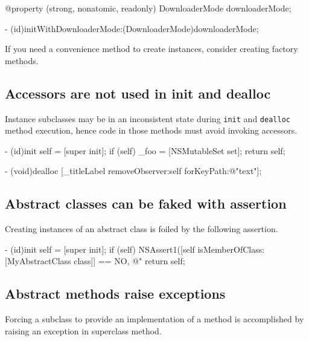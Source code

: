 \documentclass[10pt]{extarticle}
\newenvironment{codelisting}
{\footnotesize\mdframed[middlelinewidth=0.5pt, middlelinecolor=BaliHaiColor, skipabove=15pt]\verbatim}
{\endverbatim\endmdframed\vspace{12pt}\normalsize}
\newenvironment{tiplisting}
{\small\mdframed[middlelinewidth=0.5pt, middlelinecolor=GoldenDreamColor, skipabove=15pt]{\textbf{Tip:}}}
{\endmdframed\vspace{12pt}\normalsize}
\newcommand{\inlinecode}[1]{{\textcolor{TundoraColor}{\texttt{#1}}}}
\begin{document}
\begin{codelisting}
@property (strong, nonatomic, readonly) DownloaderMode downloaderMode;

- (id)initWithDownloaderMode:(DownloaderMode)downloaderMode;
\end{codelisting}

\begin{tiplisting}
If you need a convenience method to create instances, consider creating factory methods.
\end{tiplisting}


\subsection{Accessors are not used in init and dealloc}

Instance subclasses may be in an inconsistent state during \inlinecode{init} and \inlinecode{dealloc} method execution, hence code in those methods must avoid invoking accessors.

\begin{codelisting}
- (id)init
{
    self = [super init];
    if (self) {
        _foo = [NSMutableSet set];
    }
    return self;
}

- (void)dealloc
{
    [_titleLabel removeObserver:self forKeyPath:@"text"];
}
\end{codelisting}


\subsection{Abstract classes can be faked with assertion}

Creating instances of an abstract class is foiled by the following assertion.

\begin{codelisting}
- (id)init
{
    self = [super init];
    if (self) {
        NSAssert1([self isMemberOfClass:[MyAbstractClass class]] == NO,
                  @"%
    }
    return self;
}
\end{codelisting}


\subsection{Abstract methods raise exceptions}

Forcing a subclass to provide an implementation of a method is accomplished by raising an exception in superclass method.
\end{document}
